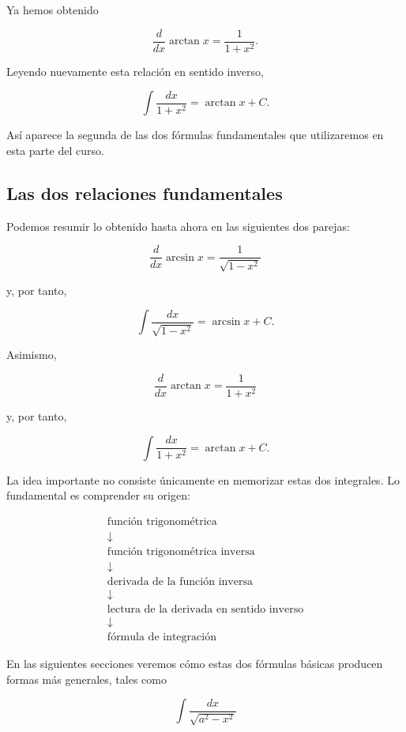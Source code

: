 \documentclass[12pt]{article}
\theoremstyle{definition}
\theoremstyle{remark}
\begin{document}
Ya hemos obtenido

\[
\frac{d}{dx}\arctan x
=
\frac{1}{1+x^2}.
\]

Leyendo nuevamente esta relación en sentido inverso,

\[
\boxed{
\int\frac{dx}{1+x^2}
=
\arctan x+C.
}
\]

Así aparece la segunda de las dos fórmulas fundamentales que
utilizaremos en esta parte del curso.

\subsection*{Las dos relaciones fundamentales}

Podemos resumir lo obtenido hasta ahora en las siguientes dos parejas:

\[
\boxed{
\frac{d}{dx}\arcsin x
=
\frac{1}{\sqrt{1-x^2}}
}
\]

y, por tanto,

\[
\boxed{
\int\frac{dx}{\sqrt{1-x^2}}
=
\arcsin x+C.
}
\]

Asimismo,

\[
\boxed{
\frac{d}{dx}\arctan x
=
\frac{1}{1+x^2}
}
\]

y, por tanto,

\[
\boxed{
\int\frac{dx}{1+x^2}
=
\arctan x+C.
}
\]

La idea importante no consiste únicamente en memorizar estas dos
integrales. Lo fundamental es comprender su origen:

\[
\boxed{
\begin{array}{c}
\text{función trigonométrica}
\\[2mm]
\downarrow
\\[2mm]
\text{función trigonométrica inversa}
\\[2mm]
\downarrow
\\[2mm]
\text{derivada de la función inversa}
\\[2mm]
\downarrow
\\[2mm]
\text{lectura de la derivada en sentido inverso}
\\[2mm]
\downarrow
\\[2mm]
\text{fórmula de integración}
\end{array}
}
\]

En las siguientes secciones veremos cómo estas dos fórmulas básicas
producen formas más generales, tales como

\[
\int\frac{dx}{\sqrt{a^2-x^2}}
\]
\end{document}
